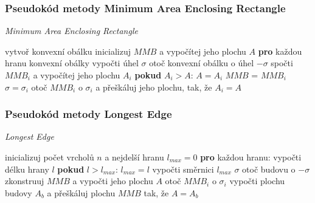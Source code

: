 \documentclass[15pt]{article}
\begin{document}
\begin{spacing}{1.5}
\subsubsection*{Pseudokód metody Minimum Area Enclosing Rectangle}
    \begin{algorithm}
        \caption {\textit{Minimum Area Enclosing Rectangle}}
        \begin{algorithmic}[1]
            \State vytvoř konvexní obálku
            \State inicializuj $MMB$ a vypočítej jeho plochu $A$
            \State \textbf{pro} každou hranu konvexní obálky
            \State \indent vypočti úhel $\sigma$
            \State \indent otoč konvexní obálku o úhel $-\sigma$
            \State \indent spočti $MMB_{i}$ a vypočítej jeho plochu $A_{i}$
            \State \indent \textbf{pokud} $A_{i} >  A$:
            \State \indent \indent $A = A_{i}$
            \State \indent \indent $MMB$ = $MMB_{i}$
            \State \indent \indent $\sigma = \sigma_{i}$
            \State otoč $MMB_{i}$ o $\sigma_{i}$ a přeškáluj jeho plochu, tak, že $A_{i} =  A$
        \end{algorithmic}
    \end{algorithm}
    
\subsubsection*{Pseudokód metody Longest Edge}
    \begin{algorithm}
        \caption {\textit{Longest Edge}}
        \begin{algorithmic}[1]
            \State inicializuj počet vrcholů $n$ a nejdelší hranu $l_{max} = 0$
            \State \textbf{pro} každou hranu:
            \State \indent vypočti délku hrany $l$
            \State \indent \textbf{pokud} $l > l_{max}$:
            \State \indent \indent $l_{max} = l$
            \State \indent \indent vypočti směrnici $l_{max}$ $\sigma$
            \State \indent otoč budovu o $ - \sigma$
            \State \indent zkonstruuj $MMB$ a vypočti jeho plochu $A$
            \State \indent otoč $MMB_{i}$ o $\sigma_{i}$ 
            \State \indent vypočti plochu budovy $A_{b}$ a přeškáluj plochu $MMB$ tak, že $A = A_{b}$
        \end{algorithmic}
    \end{algorithm}


\end{spacing}
\end{document}
